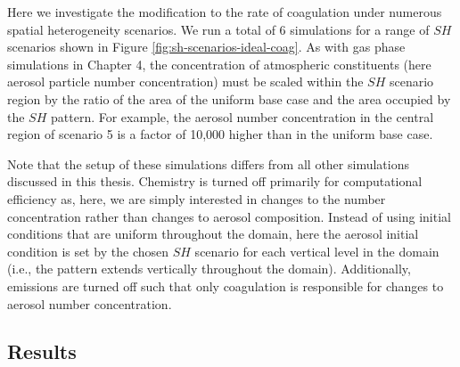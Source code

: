 Here we investigate the modification to the rate of coagulation under numerous spatial heterogeneity scenarios. We run a total of 6 simulations for a range of $SH$ scenarios shown in Figure \ref{fig:sh-scenarios-ideal-coag}. As with gas phase simulations in Chapter 4, the concentration of atmospheric constituents (here aerosol particle number concentration) must be scaled within the $SH$ scenario region by the ratio of the area of the uniform base case and the area occupied by the $SH$ pattern. For example, the aerosol number concentration in the central region of scenario 5 is a factor of 10,000 higher than in the uniform base case. 

Note that the setup of these simulations differs from all other simulations discussed in this thesis. Chemistry is turned off primarily for computational efficiency as, here, we are simply interested in changes to the number concentration rather than changes to aerosol composition. Instead of using initial conditions that are uniform throughout the domain, here the aerosol initial condition is set by the chosen $SH$ scenario for each vertical level in the domain (i.e., the pattern extends vertically throughout the domain). Additionally, emissions are turned off such that only coagulation is responsible for changes to aerosol number concentration.

\subsection{Results}

